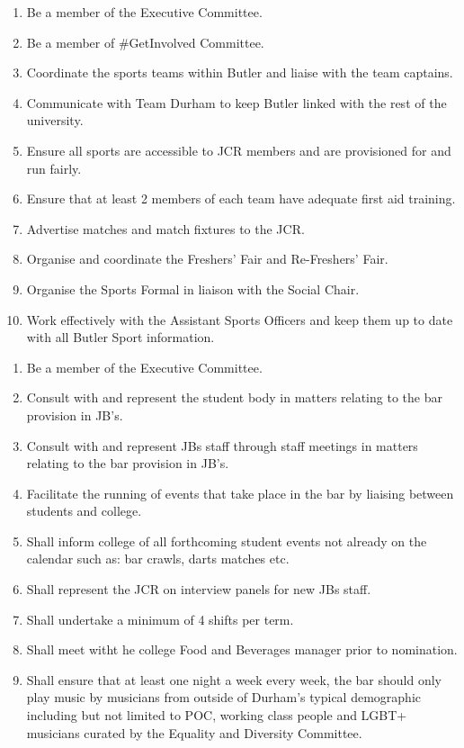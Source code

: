 \begin{enumerate}
    \item Be a member of the Executive Committee.
    \item Be a member of \#GetInvolved Committee.
    \item Coordinate the sports teams within Butler and liaise with the team captains.
    \item Communicate with Team Durham to keep Butler linked with the rest of the university.
    \item Ensure all sports are accessible to JCR members and are provisioned for and run fairly.
    \item Ensure that at least 2 members of each team have adequate first aid training.
    \item Advertise matches and match fixtures to the JCR. 
    \item Organise and coordinate the Freshers' Fair and Re-Freshers' Fair.
    \item Organise the Sports Formal in liaison with the Social Chair.
    \item Work effectively with the Assistant Sports Officers and keep them up to date with all Butler Sport information.
\end{enumerate}

\begin{enumerate}
    \item Be a member of the Executive Committee.
    \item Consult with and represent the student body in matters relating to the bar provision in JB’s. 
    \item Consult with and represent JBs staff through staff meetings in matters relating to the bar provision in JB’s.
    \item Facilitate the running of events that take place in the bar by liaising between students and college.
    \item Shall inform college of all forthcoming student events not already on the calendar such as: bar crawls, darts matches etc. 
    \item Shall represent the JCR on interview panels for new JBs staff. \item Shall undertake a minimum of 4 shifts per term.
    \item Shall meet witht he college Food and Beverages manager prior to nomination.
    \item Shall ensure that at least one night a week every week, the bar should only play music by musicians from outside of Durham’s typical demographic including but not limited to POC, working class people and LGBT+ musicians curated by the Equality and Diversity Committee.
\end{enumerate}

